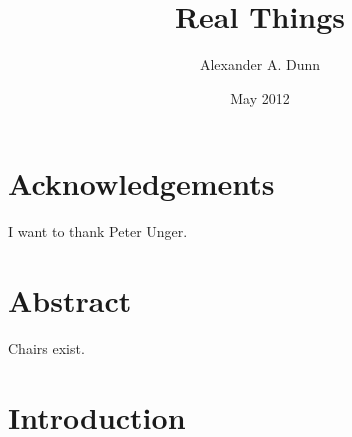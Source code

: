 \documentclass[12pt,twoside]{reedfancy}
\title{Real Things}
\author{Alexander A. Dunn}
\date{May 2012}
\newenvironment{epigram}{%
	\begin{minipage}[c]{0.75\textwidth}
	\vspace{2.5in}
	\begin{spacing}{1}
	\begin{list}{}{%
	\setlength{\labelwidth}{0pt}
	\setlength{\leftmargin}{1.4in}
	\setlength{\rightmargin}{.25in}}
	\item[]
	}{%
	\end{list}
	\end{spacing}
	\end{minipage}
	\newline
	}
\begin{document}
  \maketitle
  \frontmatter %
  \pagestyle{empty} %


\begin{spacing}{1.25}

    \chapter*{Acknowledgements}
	I want to thank Peter Unger.


    \tableofcontents

\chapter*{Abstract}
Chairs exist.

	\mainmatter %
	\pagestyle{fancyplain} %
  
\chapter*{Introduction}




\end{spacing}
\end{document}
